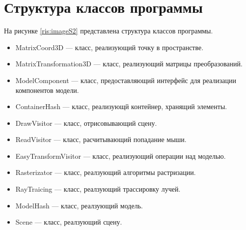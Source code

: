 \section{Структура классов программы}
На рисунке \ref{ris:imageS2} представлена структура классов программы. 
\begin{itemize}
	\item MatrixCoord3D --- класс, реализующий точку в пространстве.
	\item MatrixTransformation3D --- класс, реализующий матрицы преобразований.
	\item ModelComponent --- класс, предоставляющий интерфейс для реализации компонентов модели.
	\item ContainerHash --- класс, реализующй контейнер, хранящий элементы.
	\item DrawVisitor --- класс, отрисовывающий сцену.
	\item ReadVisitor --- класс, расчитывающий попадание мыши.
	\item EasyTransformVisitor --- класс, реализующий операции над моделью.
	\item Rasterizator --- класс, реалзующий алгоритмы растризации.
	\item RayTraicing --- класс, реалзующий трассировку лучей.
	\item ModelHash --- класс, реалзующий модель.
	\item Scene --- класс, реалзующий сцену.
\end{itemize} 
\begin{center}
\def\svgwidth{15cm}

\label{ris:imageS2}
\end{center}
